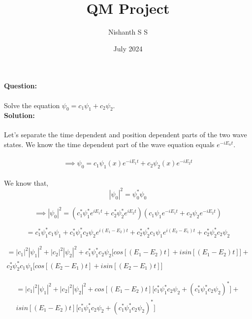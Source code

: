 \documentclass[12pt]{article}
\title{QM Project}
\author{Nishanth S S}
\date{July 2024}
\begin{document}
\maketitle

\noindent
\textbf{Question:}
\\
\\
Solve the equation $ \psi_0 = c_1 \psi_1 + c_2 \psi_2. $ 
\\

\noindent
\textbf{Solution:}
\\
\\
Let's separate the  time dependent and position dependent parts of the two wave states. We know the time dependent part of the wave equation equals $ e^{-i E_n t}$. 
\\
\\
\[ \implies \psi_0 = c_1 \psi_1(x) e^{-i E_1 t} + c_2 \psi_2(x) e^{-i E_2 t}\]
\\

We know that, \[ |\psi_0|^2 = \psi_0^* \psi_0 \]

\[ \implies |\psi_0|^2 = (c_1^* \psi_1^* e^{i E_1 t} + c_2^* \psi_2^* e^{i E_2 t})(c_1 \psi_1 e^{-i E_1 t} + c_2 \psi_2 e^{-i E_2 t})\]

\[ = c_1^* \psi_1^* c_1 \psi_1 + c_1^* \psi_1^* c_2 \psi_2 e^{i (E_1 - E_2)t} + c_2^* \psi_2^* c_1 \psi_1 e^{i (E_2 - E_1)t} + c_2^* \psi_2^* c_2 \psi_2 \]

\begin{multline*}
= |c_1|^2 |\psi_1|^2 + |c_2|^2 |\psi_2|^2 + c_1^* \psi_1^* c_2 \psi_2 \Big [cos[(E_1 - E_2)t] + i sin[(E_1 - E_2)t] \Big]   + 
\\
c_2^* \psi_2^* c_1 \psi_1 \Big [cos[(E_2 - E_1)t] + i sin[(E_2 - E_1)t] \Big] 
\end{multline*}

\begin{multline*}
= |c_1|^2 |\psi_1|^2 + |c_2|^2 |\psi_2|^2 +  cos[(E_1 - E_2)t] \Big [c_1^* \psi_1^* c_2 \psi_2 + (c_1^* \psi_1^* c_2 \psi_2)^* \Big ] + 
\\
i sin[(E_1 - E_2)t] \Big[ c_1^* \psi_1^* c_2 \psi_2 + (c_1^* \psi_1^* c_2 \psi_2)^* \Big]
\end{multline*}
\end{document}
